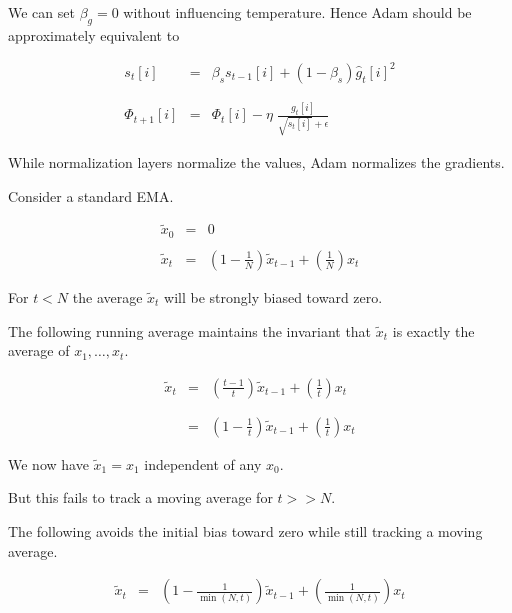 {

We can set $\beta_g = 0$ without influencing temperature.  Hence Adam should be approximately equivalent to


\begin{eqnarray*}
{ s_t[i]} & { =} & { \beta_s s_{t-1}[i] + (1-\beta_s)\hat{g}_t[i]^2} \\
\\
\\
{ \Phi_{t+1}[i]} & { =} & { \Phi_t[i] - \eta\;\frac{g_t[i]}{\sqrt{s_t[i]} + \epsilon}}
\end{eqnarray*}

\vfill
While normalization layers normalize the values, Adam normalizes the gradients.


Consider a standard EMA.

\begin{eqnarray*}
\tilde{x}_0 & = & 0 \\
\\
\tilde{x}_t & = & \left(1-\frac{1}{N}\right)\tilde{x}_{t-1} + \left(\frac{1}{N}\right)x_t
\end{eqnarray*}

\vfill
For $t < N$ the average $\tilde{x}_t$ will be strongly biased toward zero.


The following running average maintains the invariant that $\tilde{x}_t$ is exactly the average of $x_1,\ldots,x_t$.

\begin{eqnarray*}
\tilde{x}_t & = & \left(\frac{t-1}{t}\right)\tilde{x}_{t-1} + \left(\frac{1}{t}\right)x_t \\
\\
\\
& = & \left(1-\frac{1}{t}\right)\tilde{x}_{t-1} + \left(\frac{1}{t}\right)x_t
\end{eqnarray*}

\vfill
We now have $\tilde{x}_1 = x_1$ independent of any $x_0$.

\vfill
But this fails to track a moving average for $t >> N$.


The following avoids the initial bias toward zero while still tracking a moving average.

\begin{eqnarray*}
\tilde{x}_t & = & \left(1-\frac{1}{\min(N,t)}\right)\tilde{x}_{t-1} + \left(\frac{1}{\min(N,t)}\right)x_t
\end{eqnarray*}

}
